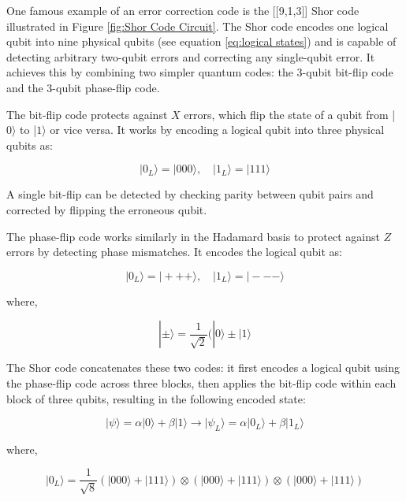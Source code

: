 One famous example of an error correction code is the [[9,1,3]] Shor code \cite{PhysRevA.52.R2493} illustrated in Figure \ref{fig:Shor Code Circuit}. The Shor code encodes one logical qubit into nine physical qubits (see equation \ref{eq:logical states}) and is capable of detecting arbitrary two-qubit errors and correcting any single-qubit error. It achieves this by combining two simpler quantum codes: the 3-qubit bit-flip code and the 3-qubit phase-flip code. 

The bit-flip code protects against \(X\) errors, which flip the state of a qubit from |\(0\rangle\) to |\(1\rangle\) or vice versa. It works by encoding a logical qubit into three physical qubits as:

\begin{equation}
    |0_L\rangle=|000\rangle, \quad|1_L\rangle=|111\rangle
\end{equation}

A single bit-flip can be detected by checking parity between qubit pairs and corrected by flipping the erroneous qubit.

The phase-flip code works similarly in the Hadamard basis to protect against \(Z\) errors by detecting phase mismatches. It encodes the logical qubit as:

\begin{equation}
    |0_L\rangle=|+++\rangle, \quad|1_L\rangle=|---\rangle
\end{equation}

where,

\begin{equation}
    |\pm\rangle=\frac{1}{\sqrt{2}}(|0\rangle\pm|1\rangle
\end{equation}

The Shor code concatenates these two codes: it first encodes a logical qubit using the phase-flip code across three blocks, then applies the bit-flip code within each block of three qubits, resulting in the following encoded state:

\begin{equation}
\label{eq:logical states}
    |\psi\rangle = \alpha|0\rangle + \beta|1\rangle \rightarrow |\psi_L\rangle = \alpha|0_L\rangle + \beta|1_L\rangle
\end{equation}

where,

\begin{equation}
    |0_L\rangle=\frac{1}{\sqrt{8}}(|000\rangle+|111\rangle)\otimes(|000\rangle+|111\rangle)\otimes(|000\rangle+|111\rangle)
\end{equation}

